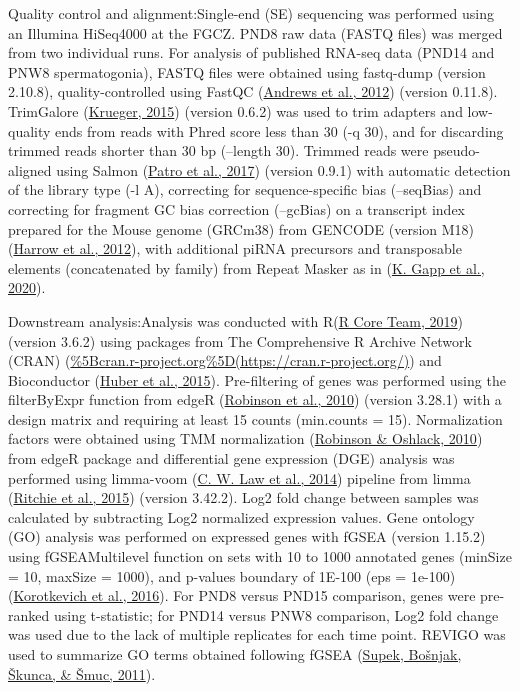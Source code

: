 \documentclass[12pt,twoside]{reedthesis}
\begin{document}
Quality control and alignment:Single-end (SE) sequencing was performed
using an Illumina HiSeq4000 at the FGCZ. PND8 raw data (FASTQ files) was
merged from two individual runs. For analysis of published RNA-seq data
(PND14 and PNW8 spermatogonia), FASTQ files were obtained using
fastq-dump (version 2.10.8), quality-controlled using FastQC
(\protect\hyperlink{ref-andrews2012}{Andrews et al., 2012}) (version 0.11.8). TrimGalore (\protect\hyperlink{ref-krueger2015}{Krueger, 2015}) (version
0.6.2) was used to trim adapters and low-quality ends from reads with
Phred score less than 30 (-q 30), and for discarding trimmed reads
shorter than 30 bp (--length 30). Trimmed reads were pseudo-aligned
using Salmon (\protect\hyperlink{ref-patro2017}{Patro et al., 2017}) (version 0.9.1) with automatic detection of
the library type (-l A), correcting for sequence-specific bias
(--seqBias) and correcting for fragment GC bias correction (--gcBias) on
a transcript index prepared for the Mouse genome (GRCm38) from GENCODE
(version M18) (\protect\hyperlink{ref-harrow2012}{Harrow et al., 2012}), with additional piRNA precursors and
transposable elements (concatenated by family) from Repeat Masker as in
(\protect\hyperlink{ref-gapp2020}{K. Gapp et al., 2020}).

Downstream analysis:Analysis was conducted with R(\protect\hyperlink{ref-rcoreteam2019}{R Core Team, 2019})
(version 3.6.2) using packages from The Comprehensive R Archive Network
(CRAN)
(\url{\%5Bcran.r-project.org\%5D(https://cran.r-project.org/)})
and Bioconductor (\protect\hyperlink{ref-huber2015}{Huber et al., 2015}). Pre-filtering of genes was performed
using the filterByExpr function from edgeR (\protect\hyperlink{ref-robinson2010}{Robinson et al., 2010}) (version
3.28.1) with a design matrix and requiring at least 15 counts
(min.counts = 15). Normalization factors were obtained using TMM
normalization (\protect\hyperlink{ref-robinson2010a}{Robinson \& Oshlack, 2010}) from edgeR package and differential gene
expression (DGE) analysis was performed using limma-voom (\protect\hyperlink{ref-law2014}{C. W. Law et al., 2014})
pipeline from limma (\protect\hyperlink{ref-ritchie2015}{Ritchie et al., 2015}) (version 3.42.2). Log2 fold change
between samples was calculated by subtracting Log2 normalized expression
values. Gene ontology (GO) analysis was performed on expressed genes
with fGSEA (version 1.15.2) using fGSEAMultilevel function on sets with
10 to 1000 annotated genes (minSize = 10, maxSize = 1000), and p-values
boundary of 1E-100 (eps = 1e-100) (\protect\hyperlink{ref-korotkevich2016}{Korotkevich et al., 2016}). For PND8 versus
PND15 comparison, genes were pre-ranked using t-statistic; for PND14
versus PNW8 comparison, Log2 fold change was used due to the lack of
multiple replicates for each time point. REVIGO was used to summarize GO
terms obtained following fGSEA (\protect\hyperlink{ref-supek2011}{Supek, Bošnjak, Škunca, \& Šmuc, 2011}).
\end{document}
